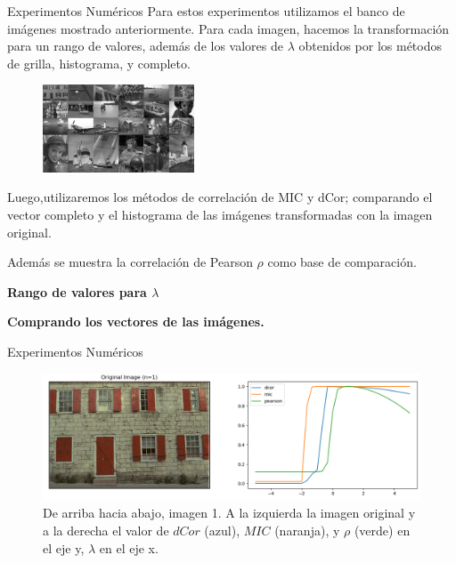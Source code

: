 \documentclass{beamer}
\begin{document}
\begin{frame}{Experimentos Numéricos}
    Para estos experimentos utilizamos el banco de imágenes mostrado anteriormente. Para cada imagen, hacemos la transformación para un rango de valores, además de los valores de $\lambda$ obtenidos por los métodos de grilla, histograma, y completo.
    \begin{figure}[H]
        \centering
        \includegraphics[width=0.4\textwidth]{all_images_grid_bw.png}
    \end{figure}

    Luego,utilizaremos los métodos de correlación de MIC y dCor; comparando el vector completo y el histograma de las imágenes transformadas con la imagen original.
    
    Además se muestra la correlación de Pearson $\rho$ como base de comparación.
\end{frame}

\begin{frame}
    \begin{center}
        {\LARGE\bf Rango de valores para $\lambda$}
    \end{center}
    \begin{center}
        {\Large\bf Comprando los vectores de las imágenes.}
    \end{center}
\end{frame}


\begin{frame}{Experimentos Numéricos}
    
    \begin{figure}[H]
        \centering
        \includegraphics[width=\textwidth]{lam_v_com_one.png}
        \caption{De arriba hacia abajo, imagen 1. A la izquierda la imagen original y a la derecha el valor de $dCor$ (azul), $MIC$ (naranja), y $\rho$ (verde) en el eje y, $\lambda$ en el eje x.}
    \end{figure}
\end{frame}
\end{document}

